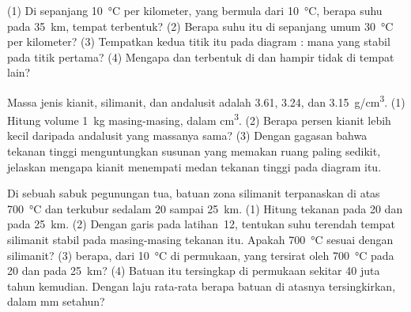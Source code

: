 \begin{exercise}[$\star\star\star$]\label{exo:g12:metamorphic-rocks:13}
(1) Di sepanjang   \qty{10}{\celsius} per kilometer, yang
bermula dari \qty{10}{\celsius}, berapa suhu pada \qty{35}{km}, tempat 
terbentuk? (2) Berapa suhu itu di sepanjang  umum
\qty{30}{\celsius} per kilometer? (3) Tempatkan kedua titik itu pada diagram
:  mana yang stabil pada titik pertama? (4) Mengapa 
dan  terbentuk di  dan hampir tidak di tempat lain?
\end{exercise}

\begin{exercise}[$\star\star\star$]\label{exo:g12:metamorphic-rocks:14}
Massa jenis kianit, silimanit, dan andalusit adalah \num{3.61},
\num{3.24}, dan \qty{3.15}{g/cm^3}. (1) Hitung volume \qty{1}{kg} masing-masing,
dalam \unit{cm^3}. (2) Berapa persen kianit lebih kecil daripada andalusit yang
massanya sama? (3) Dengan gagasan bahwa tekanan tinggi menguntungkan susunan
yang memakan ruang paling sedikit, jelaskan mengapa kianit menempati medan
tekanan tinggi pada diagram itu.
\end{exercise}

\begin{exercise}[$\star\star\star$]\label{exo:g12:metamorphic-rocks:15}
Di sebuah sabuk pegunungan tua, batuan zona silimanit terpanaskan di atas
\qty{700}{\celsius} dan terkubur sedalam 20 sampai \qty{25}{km}. (1) Hitung
tekanan pada 20 dan pada \qty{25}{km}. (2) Dengan garis pada
latihan~12, tentukan suhu terendah tempat silimanit stabil pada
masing-masing tekanan itu. Apakah \qty{700}{\celsius} sesuai dengan silimanit?
(3)  berapa, dari \qty{10}{\celsius} di permukaan, yang
tersirat oleh \qty{700}{\celsius} pada 20 dan pada \qty{25}{km}? (4) Batuan itu
tersingkap di permukaan sekitar 40 juta tahun kemudian. Dengan laju rata-rata
berapa batuan di atasnya tersingkirkan, dalam \unit{mm} setahun?
\end{exercise}

